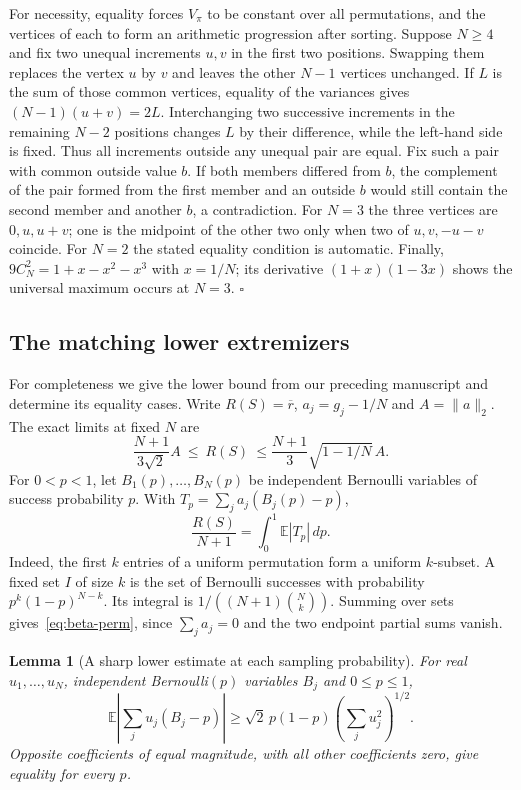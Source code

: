 \documentclass[11pt,a4paper]{article}
\newtheorem{lemma}[theorem]{Lemma}
\begin{document}
For necessity, equality forces $V_\pi$ to be constant over all
permutations, and the vertices of each to form an arithmetic
progression after sorting. Suppose $N\ge4$ and fix two unequal
increments $u,v$ in the first two positions. Swapping them replaces
the vertex $u$ by $v$ and leaves the other $N-1$ vertices unchanged.
If $L$ is the sum of those common vertices, equality of the variances
gives $(N-1)(u+v)=2L$. Interchanging two successive increments in
the remaining $N-2$ positions changes $L$ by their difference, while
the left-hand side is fixed. Thus all increments outside any unequal
pair are equal. Fix such a pair with common outside value $b$.
If both members differed from $b$, the complement of the pair formed
from the first member and an outside $b$ would still contain the second
member and another $b$, a contradiction. For $N=3$ the three vertices
are $0,u,u+v$; one is the midpoint of the other two only when two of
$u,v,-u-v$ coincide. For $N=2$ the stated equality condition is automatic.
Finally, $9 C_N^2=1+x-x^2-x^3$ with $x=1/N$; its derivative
$(1+x)(1-3x)$ shows the universal maximum occurs at $N=3$.
\hfill$\square$


\subsection{The matching lower extremizers}
For completeness we give the lower bound from our preceding manuscript
and determine its equality cases. Write $R(S)=\overline r$, $a_j=g_j-1/N$
and $A=\|a\|_2$. The exact limits at fixed $N$ are
\[
 \frac{N+1}{3\sqrt2}A\ \le\ R(S)\ \le \frac{N+1}{3}\sqrt{1-1/N}\,A .
\]
For $0<p<1$, let $B_1(p),\ldots,B_N(p)$ be independent Bernoulli
variables of success probability $p$. With $T_p=\sum_j a_j(B_j(p)-p)$,
\begin{equation}
 \frac{R(S)}{N+1}=\int_0^1\mathbb E|T_p|\,dp .
 \label{eq:beta-perm}
\end{equation}
Indeed, the first $k$ entries of a uniform permutation form a uniform
$k$-subset. A fixed set $I$ of size $k$ is the set of Bernoulli
successes with probability $p^k(1-p)^{N-k}$. Its integral is
$1/((N+1)\binom Nk)$. Summing over sets gives~\eqref{eq:beta-perm},
since $\sum_j a_j=0$ and the two endpoint partial sums vanish.

\begin{lemma}[A sharp lower estimate at each sampling probability]
\label{lem:bias-bern}
For real $u_1,\ldots,u_N$, independent Bernoulli$(p)$ variables $B_j$
and $0\le p\le1$,
\[
 \mathbb E\left|\sum_j u_j(B_j-p)\right|
 \ge \sqrt2\,p(1-p)\left(\sum_j u_j^2\right)^{1/2}.
\]
Opposite coefficients of equal magnitude, with all other coefficients
zero, give equality for every $p$.
\end{lemma}
\end{document}

